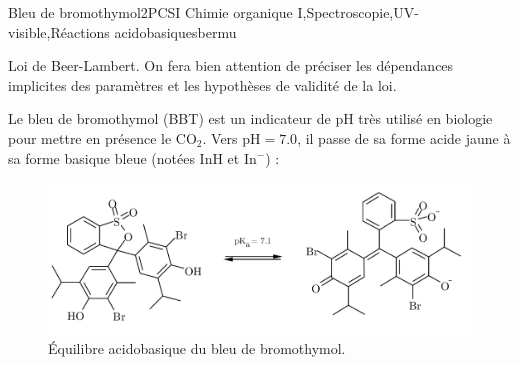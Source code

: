 
\begin{exercise}{Bleu de bromothymol}{2}{PCSI}
{Chimie organique I,Spectroscopie,UV-visible,Réactions acidobasiques}{bermu}

\begin{questions}
\questioncours Loi de Beer-Lambert. On fera bien attention de préciser les dépendances implicites des paramètres et les hypothèses de validité de la loi.

\begin{EnvUplevel}
    Le bleu de bromothymol (BBT) est un indicateur de pH très utilisé en biologie pour mettre en présence le $\mathrm{CO_2}$. Vers $\text{pH} = 7.0$, il passe de sa forme acide jaune à sa forme basique bleue (notées $\mathrm{InH}$ et $\mathrm{In^{-}}$) :\vspace{-1em}
    \begin{figure}[H]
        \centering
        \includegraphics[width=.6\linewidth]{chimiePC/orga/BBT1.pdf}\vspace{-2em}
        \caption{\'Equilibre acidobasique du bleu de bromothymol.}
        \label{fig:BBT1}\vspace{-1em}
    \end{figure}
    

\end{EnvUplevel}
\end{questions}
\end{exercise}
